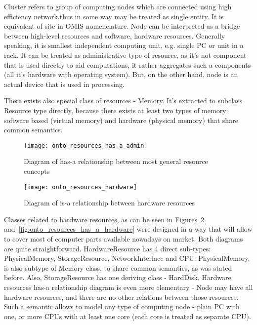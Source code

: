 Cluster refers to group of computing nodes which are connected using high efficiency network,thus in some way may be
treated as single entity. It is equivalent of site in OMIS nomenclature\cite{tl9702e}. Node can be interpreted as a
bridge between high-level resources and software, hardware resources. Generally speaking, it is smallest independent
computing unit, e.g. single PC or unit in a rack. It can be treated as administrative type of resource, as it's
not component that is used directly to aid computations, it rather aggregates such a components (all it's hardware with
operating system). But, on the other hand, node is an actual device that is used in processing. 

There exists also special class of resources - Memory. It's extracted to subclass Resource type directly, because there
exists at least two types of memory: software based (virtual memory) and hardware (physical memory) that share
common semantics.

\begin{figure}[ht]
  \centering
  \texttt{[image: onto\_resources\_has\_a\_admin]}
  \caption{Diagram of has-a relationship between most general resource concepts}
  \label{fig:onto_resources_has_a_admin}
\end{figure}

\pagebreak


\begin{figure}[ht]
  \centering
  \texttt{[image: onto\_resources\_hardware]}
  \caption{Diagram of is-a relationship between hardware resources}
  \label{fig:onto_resources_hardware}
\end{figure}

Classes related to hardware resources, as can be seen in Figures~\ref{fig:onto_resources_hardware}
and~\ref{fig:onto_resources_has_a_hardware} were designed in a way that will allow to cover most of computer parts
available nowadays on market. Both diagrams are quite straightforward. HardwareResource has 4 direct sub-types:
PhysicalMemory, StorageResource, NetworkInterface and CPU. PhysicalMemory, is also subtype of Memory class, to share
common semantics, as was stated before. Also, StorageResource has one deriving class - HardDisk. 
Hardware resources has-a relationship diagram is even more elementary - Node may have all hardware resources, and there
are no other relations between those resources. Such a semantic allows to model any type of computing node - plain PC
with one, or more CPUs with at least one core (each core is treated as separate CPU).

